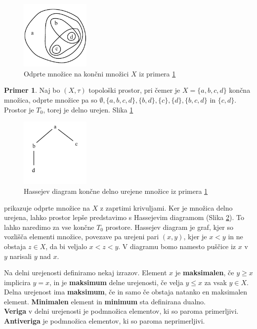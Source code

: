 \documentclass[a4paper, 12pt]{book}
\theoremstyle{definition}
\newtheorem{example}{Primer}[section]
\begin{document}
\begin{figure}[h]
  \label{pic1}
    \begin{center}
    \includegraphics[width=0.3\textwidth]{example-topology.pdf}
    \end{center}
    \caption{Odprte množice na končni množici $X$ iz primera \ref{ex1}}
\end{figure}
\begin{example}\label{ex1}
  Naj bo $(X,\tau)$ topološki prostor, pri čemer je $X = \{a,b,c,d\}$ končna
  množica, odprte množice pa so $\emptyset, \{a,b,c,d\}, \{b,d\}, \{c\}, \{d\},
  \{b,c,d\}$ in $\{c,d\}$. Prostor je $T_0$, torej je delno urejen. Slika \ref{pic1}
  \begin{figure}[h]
      \begin{center}
      \includegraphics[width=0.3\textwidth]{hasse-example.pdf}
      \end{center}
      \caption{Hassejev diagram končne delno urejene množice iz primera \ref{ex1}}
      \label{pic2}
  \end{figure}
    prikazuje odprte množice na $X$ z zaprtimi krivuljami.
    Ker je množica delno urejena, lahko prostor lepše predstavimo s Hassejevim diagramom (Slika \ref{pic2}).
    To lahko naredimo za vse končne $T_0$ prostore. Hassejev diagram je graf,
    kjer so vozlišča elementi množice, povezave pa urejeni pari $(x,y)$, kjer je $x < y$ in
    ne obstaja $z \in X$, da bi veljalo $x < z < y$. V diagramu
    bomo namesto puščice iz $x$ v $y$ narisali $y$ nad $x$.
\end{example}
\newpage
Na delni urejenosti definiramo nekaj izrazov.
Element $x$ je \textbf{maksimalen}, če $y \geq x$ implicira $y=x$, in je \textbf{maksimum} delne urejenosti, če velja
$y \leq x$ za vsak $y \in X$. Delna urejenost ima \textbf{maksimum}, če in samo če
obstaja natanko en maksimalen element. \textbf{Minimalen} element in \textbf{minimum} sta
definirana dualno.\\
\textbf{Veriga} v delni urejenosti je podmnožica elementov, ki so paroma primerljivi.
\textbf{Antiveriga} je podmnožica elementov, ki so paroma neprimerljivi.\\
\end{document}
